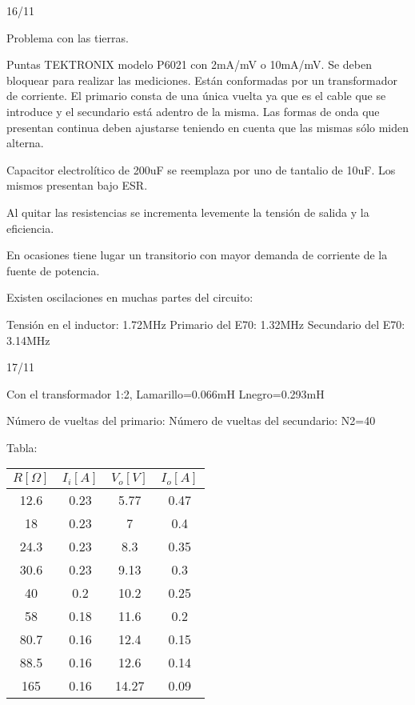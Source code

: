 16/11

Problema con las tierras.

Puntas TEKTRONIX modelo P6021 con 2mA/mV o 10mA/mV. Se deben bloquear para realizar las mediciones.
Están conformadas por un transformador de corriente. 
El primario consta de una única vuelta ya que es el cable que se introduce y el secundario está adentro de la misma. 
Las formas de onda que presentan continua deben ajustarse teniendo en cuenta que las mismas sólo miden alterna. 

Capacitor electrolítico de 200uF se reemplaza por uno de tantalio de 10uF. Los mismos presentan bajo ESR. 

Al quitar las resistencias se incrementa levemente la tensión de salida y la eficiencia. 

En ocasiones tiene lugar un transitorio con mayor demanda de corriente de la fuente de potencia. 

Existen oscilaciones en muchas partes del circuito:

Tensión en el inductor: 1.72MHz
Primario del E70: 1.32MHz
Secundario del E70: 3.14MHz

17/11

Con el transformador 1:2, 
Lamarillo=0.066mH
Lnegro=0.293mH

Número de vueltas del primario: 
Número de vueltas del secundario: N2=40 

Tabla:
 
\begin{table}[]
    \begin{tabular}{cccc}
    \hline
    $R[\Omega]$ & $I_i[A]$ & $V_o[V]$ & $I_o[A]$ \\ \hline
    12.6        & 0.23     & 5.77     & 0.47     \\
    18          & 0.23     & 7        & 0.4      \\
    24.3        & 0.23     & 8.3      & 0.35     \\
    30.6        & 0.23     & 9.13     & 0.3      \\
    40          & 0.2      & 10.2     & 0.25     \\
    58          & 0.18     & 11.6     & 0.2      \\
    80.7        & 0.16     & 12.4     & 0.15     \\
    88.5        & 0.16     & 12.6     & 0.14     \\
    165         & 0.16     & 14.27    & 0.09     \\ \hline
    \end{tabular}
\end{table}